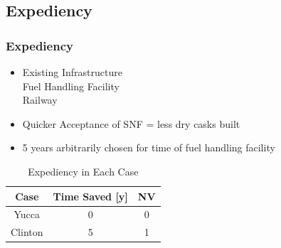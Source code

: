\subsection{Expediency}

\begin{frame}
	\frametitle{Expediency}
	\begin{itemize}
		\item Existing Infrastructure \\ Fuel Handling Facility \\ Railway
		\item Quicker Acceptance of SNF = less dry casks built
		\item 5 years arbitrarily chosen for time of fuel handling facility
	\end{itemize}
	\begin{table}[h]
		\centering
		\caption {Expediency in Each Case}
		\begin{tabular}{|c|c|c|}
			\hline
			Case & Time Saved [y] & NV \\
			\hline
			Yucca & 0 & 0\\
			Clinton & 5 & 1 \\
			\hline
		\end{tabular}
	\end{table}
\end{frame}